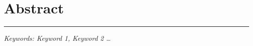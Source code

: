 \chapter*{Abstract}
\thispagestyle{frontmatter}
{
	\lipsum[1-3]
	\vspace*{1cm}
	\hrule
	\vspace*{0.25cm}
	{\small\slshape\noindent Keywords: Keyword 1, Keyword 2 \dots}
}
